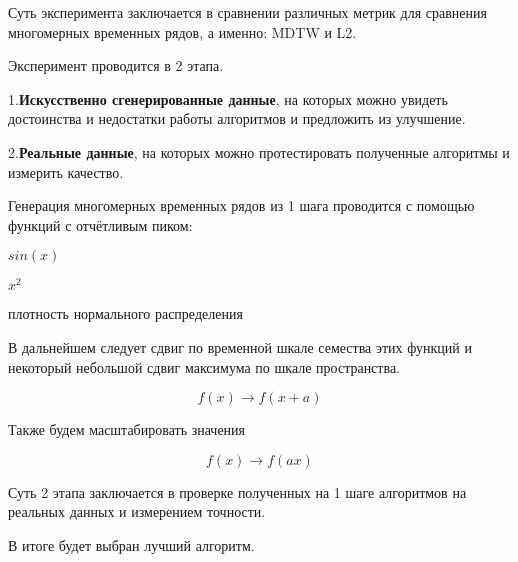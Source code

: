 \documentclass[12pt, twoside]{article}
\begin{document}
Суть эксперимента заключается в сравнении различных метрик для сравнения многомерных временных рядов, а именно: MDTW и L2.

Эксперимент проводится в 2 этапа.

1.\textbf{Искусственно сгенерированные данные}, на которых можно увидеть достоинства и недостатки работы алгоритмов и предложить из улучшение.

2.\textbf{Реальные данные}, на которых можно протестировать полученные алгоритмы и измерить качество.

Генерация многомерных временных рядов из 1 шага проводится с помощью функций с отчётливым пиком:

$sin(x)$

$x^2$

плотность нормального распределения

В дальнейшем следует сдвиг по временной шкале семества этих функций и некоторый небольшой сдвиг максимума по шкале пространства. 

$$f(x) \rightarrow f(x + a)$$

Также будем масштабировать значения 

$$f(x) \rightarrow f(ax)$$

Суть 2 этапа заключается в проверке полученных на 1 шаге алгоритмов на реальных данных и измерением точности.

В итоге будет выбран лучший алгоритм.


 


\end{document}
